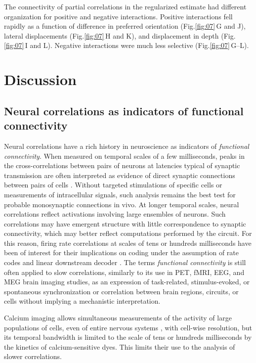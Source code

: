 \documentclass[10pt]{article}
\begin{document}
The connectivity of partial correlations in the regularized estimate had different organization for positive and negative interactions. Positive interactions fell rapidly as a function of difference in preferred orientation (Fig.\;\ref{fig:07}\,G and J), lateral displacements (Fig.\;\ref{fig:07}\,H and K), and displacement in depth (Fig.\;\ref{fig:07}\,I and L). Negative interactions were much less selective (Fig.\;\ref{fig:07}\,G--L).


\section*{Discussion}
\subsection*{Neural correlations as indicators of functional connectivity}
Neural correlations have a rich history in neuroscience as indicators of \emph{functional connectivity}. When measured on temporal scales of a few milliseconds, peaks in the cross-correlations between pairs of neurons at latencies typical of synaptic transmission are often interpreted as evidence of direct synaptic connections between pairs of cells \cite{Moore:1970,Alonso:1998,Denman:2013}. Without targeted stimulations of specific cells or measurements of intracellular signals, such analysis remains the best test for probable monosynaptic connections in vivo. At longer temporal scales, neural correlations reflect activations involving large ensembles of neurons. Such correlations may have emergent structure with little  correspondence to synaptic connectivity, which  may better reflect computations performed by the circuit.  For this reason, firing rate correlations at scales of tens or hundreds milliseconds have been of interest for their implications on coding under the assumption of rate codes and linear downstream decoder \cite{Averbeck:2006}. The terms \emph{functional connectivity} is still often applied to slow correlations, similarly to its use in PET, fMRI, EEG, and MEG brain imaging studies, as an expression of task-related, stimulus-evoked, or spontaneous synchronization or correlation between brain regions, circuits, or cells without implying a mechanistic interpretation.   

Calcium imaging allows simultaneous measurements of the activity of large populations of cells, even of entire nervous systems \cite{Leung:2013,Ahrens:2013}, with cell-wise resolution, but its temporal bandwidth is limited to the scale of tens or hundreds milliseconds by the kinetics of calcium-sensitive dyes. This limits their use to the analysis of slower correlations.
\end{document}
